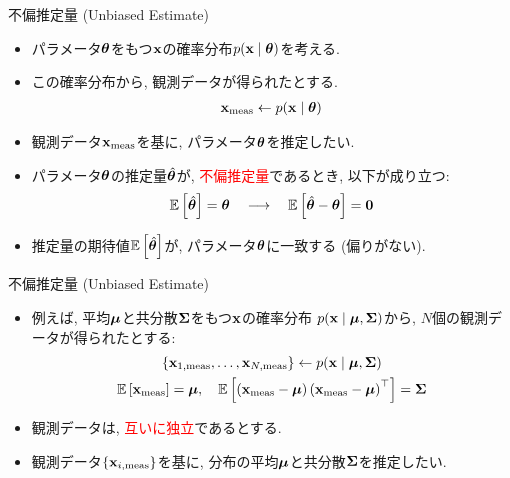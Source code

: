 \documentclass[dvipdfmx,notheorems,t]{beamer}
\begin{document}
\begin{frame}{不偏推定量 (Unbiased Estimate)}
\begin{itemize}
  \item パラメータ$\vb*{\theta}$をもつ$\vb{x}$の確率分布$p(\vb{x} \mid \vb*{\theta})$を考える.
  \item この確率分布から, 観測データが得られたとする.
  \begin{align*}
    \vb{x}_\mathrm{meas} \gets p(\vb{x} \mid \vb*{\theta})
  \end{align*}
  \item 観測データ$\vb{x}_\mathrm{meas}$を基に, パラメータ$\vb*{\theta}$を推定したい.
  \item パラメータ$\vb*{\theta}$の推定量$\hat{\vb*{\theta}}$が,
  \textcolor{red}{不偏推定量}であるとき, 以下が成り立つ:
  \begin{align*}
    \operatorname{\mathbb{E}} \left[ \hat{\vb*{\theta}} \right] = \vb*{\theta}
      \quad \longrightarrow \quad \operatorname{\mathbb{E}} \left[ \hat{\vb*{\theta}} - \vb*{\theta} \right] = \vb{0}
  \end{align*}
  \item 推定量の期待値$\operatorname{\mathbb{E}} \left[ \hat{\vb*{\theta}} \right]$が, パラメータ$\vb*{\theta}$に一致する (偏りがない).
\end{itemize}
\end{frame}

\begin{frame}{不偏推定量 (Unbiased Estimate)}
\begin{itemize}
  \item 例えば, 平均$\vb*{\mu}$と共分散$\vb{\Sigma}$をもつ$\vb{x}$の確率分布
  $p(\vb{x} \mid \vb*{\mu}, \vb{\Sigma})$から, $N$個の観測データが得られたとする:
  \begin{gather*}
    \left\{ \vb{x}_{1, \mathrm{meas}}, \ldots, \vb{x}_{N, \mathrm{meas}} \right\}
      \gets p(\vb{x} \mid \vb*{\mu}, \vb{\Sigma}) \\
    \operatorname{\mathbb{E}} \left[ \vb{x}_\mathrm{meas} \right] = \vb*{\mu}, \quad
    \operatorname{\mathbb{E}} \left[ \left( \vb{x}_\mathrm{meas} - \vb*{\mu} \right)
      \left( \vb{x}_\mathrm{meas} - \vb*{\mu} \right)^\top \right] = \vb{\Sigma}
  \end{gather*}
  \item 観測データは, \textcolor{red}{互いに独立}であるとする.
  \item 観測データ$\{ \vb{x}_{i, \mathrm{meas}} \}$を基に,
  分布の平均$\vb*{\mu}$と共分散$\vb{\Sigma}$を推定したい.
\end{itemize}
\end{frame}
\end{document}
